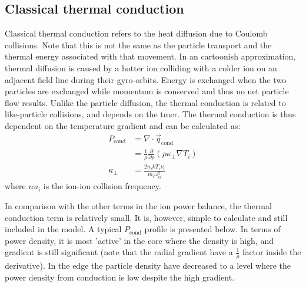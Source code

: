 \begin{refsection}

\subsection{Classical thermal conduction}\label{sec:thermal_cond}

Classical thermal conduction refers to the heat diffusion due to Coulomb collisions. Note that this is not the same as the particle transport and the thermal energy associated with that movement. In an cartoonish approximation, thermal diffusion is caused by a hotter ion colliding with a colder ion on an adjacent field line during their gyro-orbits. Energy is exchanged when the two particles are exchanged while momentum is conserved and thus no net particle flow results. Unlike the particle diffusion, the thermal conduction is related to like-particle collisions, and depends on the tmer. The thermal conduction is thus dependent on the temperature gradient and can be calculated as\cite{Shafranov1966}:
\begin{align}
    P_{\text{cond}} &= \nabla\cdot\vec{q}_{\text{cond}} \\
    &= \frac{1}{\rho}\frac{\partial}{\partial\rho}(\rho\kappa_{\perp}\nabla T_{i})\\
    \kappa_{\perp} &= \frac{2n_ikT_i\nu_i}{m_i\omega_{ci}^2}
\end{align}
where $nu_i$ is the ion-ion collision frequency.

In comparison with the other terms in the ion power balance, the thermal conduction term is relatively small. It is, however, simple to calculate and still included in the model. A typical $P_{\text{cond}}$ profile is presented below. In terms of power density, it is most 'active' in the core where the density is high, and gradient is still significant (note that the radial gradient have a $\frac{1}{\rho}$ factor inside the derivative). In the edge the particle density have decreased to a level where the power density from conduction is low despite the high gradient.


\end{refsection}

